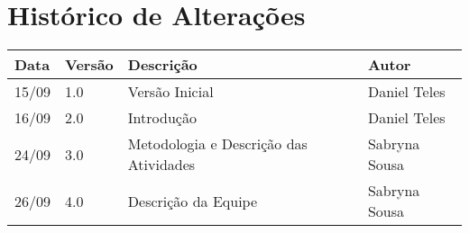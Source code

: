 \chapter*{Histórico de Alterações}

\begin{table}[!htpd]
\centering
\label{my-label}
\begin{tabular}{|l|l|l|l|}
\hline
\textbf{Data} & \textbf{Versão} & \textbf{Descrição} & \textbf{Autor} \\ \hline
15/09         & 1.0             & Versão Inicial     & Daniel Teles   \\ \hline
16/09         & 2.0             & Introdução         & Daniel Teles   \\ \hline
24/09         & 3.0             & Metodologia e Descrição das Atividades       & Sabryna Sousa  \\ \hline
26/09         & 4.0             & Descrição da Equipe       & Sabryna Sousa  \\ \hline
\end{tabular}
\end{table}

\cleardoublepage
